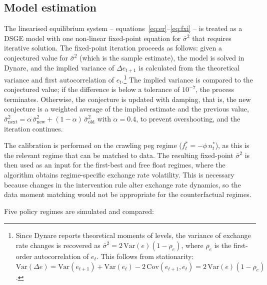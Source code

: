 \documentclass[12pt,a4paper]{article}
\begin{document}
\subsection{Model estimation}

The linearised equilibrium system -- equations~\eqref{eq:er}--\eqref{eq:fxi} -- is treated as a DSGE model with one non-linear fixed-point equation for $\bar{\sigma}^2$ that requires iterative solution. The fixed-point iteration proceeds as follows: given a conjectured value for $\bar{\sigma}^2$ (which is the sample estimate), the model is solved in Dynare, and the implied variance of $\Delta e_{t+1}$ is calculated from the theoretical variance and first autocorrelation of $e_t$.\footnote{Since Dynare reports theoretical moments of levels, the variance of exchange rate changes is recovered as $\bar{\sigma}^2 = 2\,\text{Var}(e)(1 - \rho_e)$, where $\rho_e$ is the first-order autocorrelation of $e_t$. This follows from stationarity: $\text{Var}(\Delta e) = \text{Var}(e_{t+1}) + \text{Var}(e_t) - 2\,\text{Cov}(e_{t+1}, e_t) = 2\,\text{Var}(e)(1 - \rho_e)$.} The implied variance is compared to the conjectured value; if the difference is below a tolerance of $10^{-7}$, the process terminates. Otherwise, the conjecture is updated with damping, that is, the new conjecture is a weighted average of the implied estimate and the previous value, $\bar{\sigma}^2_{\text{next}} = \alpha\, \bar{\sigma}^2_{\text{new}} + (1-\alpha)\, \bar{\sigma}^2_{\text{old}}$ with $\alpha = 0.4$, to prevent overshooting, and the iteration continues.

The calibration is performed on the crawling peg regime ($f^*_t = -\phi\, n^*_t$), as this is the relevant regime that can be matched to data. The resulting fixed-point $\bar{\sigma}^2$ is then used as an input for the first-best and free float regimes, where the algorithm obtains regime-specific exchange rate volatility. This is necessary because changes in the intervention rule alter exchange rate dynamics, so the data moment matching would not be appropriate for the counterfactual regimes.

Five policy regimes are simulated and compared:
\end{document}
